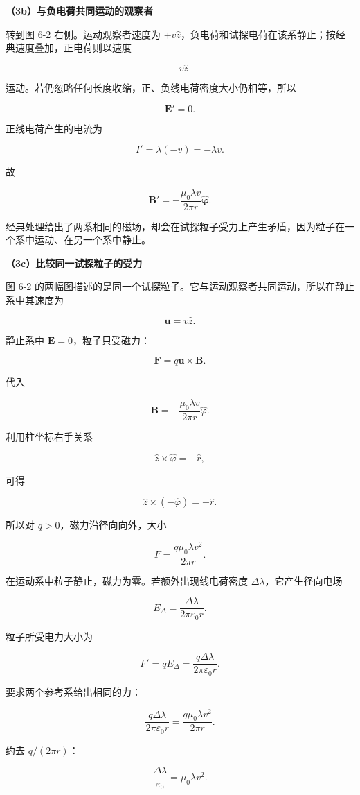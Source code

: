 \documentclass[12pt,a4paper,UTF8]{ctexart}
\begin{document}
\textbf{（3b）与负电荷共同运动的观察者}

转到图 6-2 右侧。运动观察者速度为
\(+v\hat z\)，负电荷和试探电荷在该系静止；按经典速度叠加，正电荷则以速度

\[-v\hat z\]

运动。若仍忽略任何长度收缩，正、负线电荷密度大小仍相等，所以

\[
\boxed{\bm E'=0}.
\]

正线电荷产生的电流为

\[I'=\lambda(-v)=-\lambda v.\]

故

\[
\boxed{
\bm B'=-\frac{\mu_0\lambda v}{2\pi r}\hat{\bm\varphi}
}.
\]

经典处理给出了两系相同的磁场，却会在试探粒子受力上产生矛盾，因为粒子在一个系中运动、在另一个系中静止。

\textbf{（3c）比较同一试探粒子的受力}

图 6-2
的两幅图描述的是同一个试探粒子。它与运动观察者共同运动，所以在静止系中其速度为

\[\bm u=v\hat z.\]

静止系中 \(\bm E=0\)，粒子只受磁力：

\[
\bm F=q\bm u\times\bm B.
\]

代入

\[\bm B=-\frac{\mu_0\lambda v}{2\pi r}\hat\varphi.\]

利用柱坐标右手关系

\[\hat z\times\hat\varphi=-\hat r,\]

可得

\[
\hat z\times(-\hat\varphi)=+\hat r.
\]

所以对 \(q>0\)，磁力沿径向向外，大小

\[
\boxed{
F=\frac{q\mu_0\lambda v^2}{2\pi r}
}.
\]

在运动系中粒子静止，磁力为零。若额外出现线电荷密度
\(\Delta\lambda\)，它产生径向电场

\[
E_{\Delta}=\frac{\Delta\lambda}{2\pi\varepsilon_0r}.
\]

粒子所受电力大小为

\[
F'=qE_{\Delta}
=\frac{q\Delta\lambda}{2\pi\varepsilon_0r}.
\]

要求两个参考系给出相同的力：

\[
\frac{q\Delta\lambda}{2\pi\varepsilon_0r}
=\frac{q\mu_0\lambda v^2}{2\pi r}.
\]

约去 \(q/(2\pi r)\)：

\[
\frac{\Delta\lambda}{\varepsilon_0}=\mu_0\lambda v^2.
\]
\end{document}
